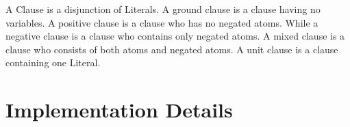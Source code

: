 A Clause is a disjunction of Literals. A ground clause is a clause having no variables. A positive clause is a clause who has no negated atoms. While a negative clause is a clause who contains only negated atoms. A mixed clause is a clause who consists of both atoms and negated atoms. A unit clause is a clause containing one Literal.


\chapter{Implementation Details}\label{chap:appendix_imp}




\begin{comment}
\chapter{Forms of first order logic formulas}
Different forms of first order logic formulas.

\chapter{Algorithms}
Different Algorithms used.
\end{comment}